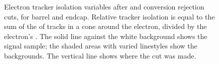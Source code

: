 
 \begin{figure}[htb]
  \begin{center}
  \end{center}
  \caption[\fixspacing Electron tracker isolation variables after \Et and conversion rejection cuts]
  {\fixspacing Electron tracker isolation variables after \Et and conversion rejection cuts, for %
   barrel and 
   endcap.  
  Relative tracker isolation is equal to the sum of the \pt of tracks 
  in a cone around the electron, divided by the electron's \pt.  
  The solid line against the white background shows the signal sample; 
  the shaded areas with varied linestyles show the backgrounds. 
  The vertical line shows where the cut was made.  
  }
  \label{fig:trkElecIsoVars}
 \end{figure}



